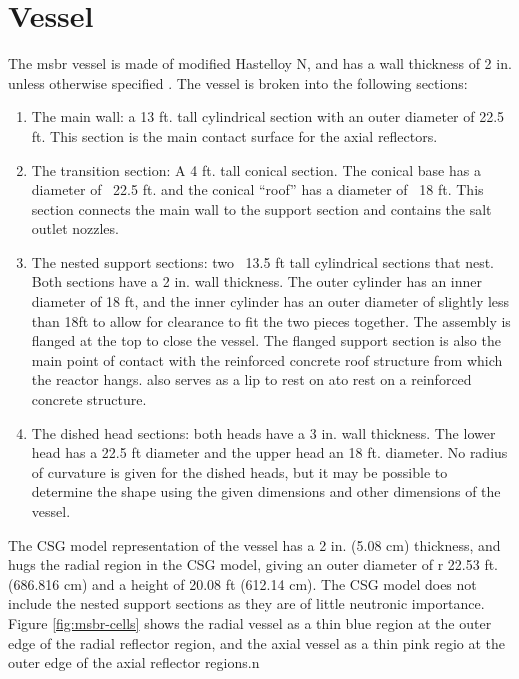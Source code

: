 \section{Vessel}
\label{sec:msbr-vessel}
The \Gls{msbr} vessel is made of modified Hastelloy N, and has a wall thickness
of 2 in. unless otherwise specified \cite{robertson_conceptual_1971}. The vessel
is broken into the following sections:
\begin{enumerate}
    \item The main wall: a 13 ft. tall cylindrical section with an outer
    diameter of 22.5 ft. This section is the main contact surface for the axial
    reflectors.
    \item The transition section: A 4 ft. tall conical section. The conical base
    has a diameter of ~22.5 ft. and the conical ``roof'' has a diameter of ~18
    ft. This section connects the main wall to the support section and contains
    the salt outlet nozzles.
    \item The nested support sections: two ~13.5 ft tall cylindrical sections
    that nest. Both sections have a 2 in. wall thickness. The outer cylinder has
    an inner diameter of 18 ft, and the inner cylinder has an outer diameter of
    slightly less than 18ft to allow for clearance to fit the two pieces
    together. The assembly is flanged at the top to close the vessel. The
    flanged support section is also the main point of contact with the
    reinforced concrete roof structure from which the reactor hangs. also serves
    as a lip to rest on ato rest on a reinforced concrete structure.
    \item The dished head sections: both heads have a 3 in. wall thickness. The
    lower head has a 22.5 ft diameter and the upper head an 18 ft. diameter. No
    radius of curvature is given for the dished heads, but it may be possible to
    determine the shape using the given dimensions and other dimensions of the
    vessel.
\end{enumerate}

The CSG model representation of the vessel has a 2 in. (5.08
\unit{\centi\metre}) thickness, and hugs the radial region in the CSG model,
giving an outer diameter of r 22.53 ft. (686.816 \unit{\centi\metre}) and a
height of 20.08 ft (612.14 \unit{\centi\metre}). The CSG model does not include
the nested support sections as they are of little neutronic importance. Figure
\ref{fig:msbr-cells} shows the radial vessel as a thin blue region at the outer
edge of the radial reflector region, and the axial vessel as a thin pink regio
at the outer edge of the axial reflector regions.n

